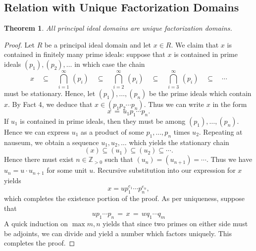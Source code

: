 \documentclass[11pt]{article}
\newtheorem{theorem}{Theorem}
\begin{document}

\subsection{Relation with Unique Factorization Domains}

\begin{adjustwidth}{0.5cm}{}
  \begin{theorem}
    All principal ideal domains are unique factorization domains.
  \end{theorem}
  \begin{proof}
    Let $R$ be a principal ideal domain and let $x \in R$. We claim that $x$ is contained in finitely many prime ideals: suppose that $x$ is contained in prime ideals $(p_{1}), (p_{2}), \ldots$ in which case the chain
    \[
      x \quad \subseteq \quad \bigcap\limits_{i = 1}^{\infty} \, (p_{i}) \quad \subseteq \quad \bigcap\limits_{i = 2}^{\infty} \, (p_{i}) \quad \subseteq \quad \bigcap\limits_{i = 3}^{\infty} \, (p_{i}) \quad \subseteq \quad \cdots
    \]
    must be stationary. Hence, let $(p_{1}), \ldots, (p_{n})$ be the prime ideals which contain $x$. By Fact 4, we deduce that $x \in (p_{1}p_{2} \cdots p_{n})$. Thus we can write $x$ in the form
    \[
      x \, = \, u_{1} p_{1} \cdots p_{n}.
    \]
    If $u_{1}$ is contained in prime ideals, then they must be among $(p_{1}), \ldots, (p_{n})$. Hence we can express $u_{1}$ as a product of some $p_{1}, \ldots, p_{n}$ times $u_{2}$. Repeating at nauseum, we obtain a sequence $u_{1}, u_{2}, \ldots$ which yields the stationary chain
    \[
      (x) \subseteq (u_{1}) \subseteq (u_{2}) \subseteq \cdots.
    \]
    Hence there must exist $n \in \mathbb{Z}_{> 0}$ such that $(u_{n}) = (u_{n + 1}) = \cdots$. Thus we have $u_{n} = u \cdot u_{n + 1}$ for some unit $u$. Recursive substitution into our expression for $x$ yields
    \[
      x = u p_{1}^{e_{1}} \cdots p_{n}^{e_{n}},
    \]
    which completes the existence portion of the proof. As per uniqueness, suppose that
    \[
      u p_{1} \cdots p_{n} \, = \, x \, = \, w q_{1} \cdots q_{m}
    \]
    A quick induction on $\max{m, n}$ yields that since two primes on either side must be adjoints, we can divide and yield a number which factors uniquely. This completes the proof.
  \end{proof}
\end{adjustwidth}

\end{document}
